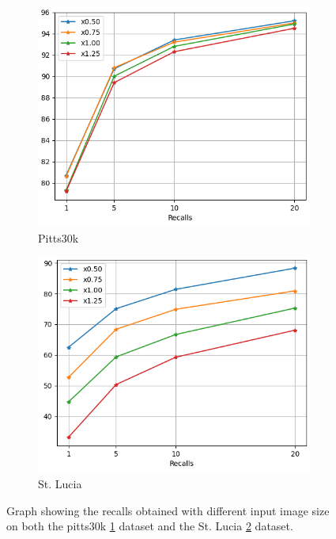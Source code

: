 \documentclass[10pt,twocolumn,letterpaper]{article}
\begin{document}
\begin{figure}
   \centering
   \begin{subfigure}[b]{0.23\textwidth}
      \centering
      \includegraphics[width=\textwidth]{img/resize/test_pitts30k_recalls_graph.png}
      \caption{Pitts30k}
      \label{fig:recalls:resize:pitts30k}
   \end{subfigure}
   \hfill
   \begin{subfigure}[b]{0.23\textwidth}
      \centering
      \includegraphics[width=\textwidth]{img/resize/test_st_lucia_recalls_graph.png}
      \caption{St. Lucia}
      \label{fig:recalls:resize:st_lucia}
   \end{subfigure}
   \caption{Graph showing the recalls obtained with different input image size on both the pitts30k \ref{fig:recalls:resize:pitts30k} dataset and the St. Lucia \ref{fig:recalls:resize:st_lucia} dataset.}
   \label{fig:recalls:resize}
\end{figure}
\end{document}

